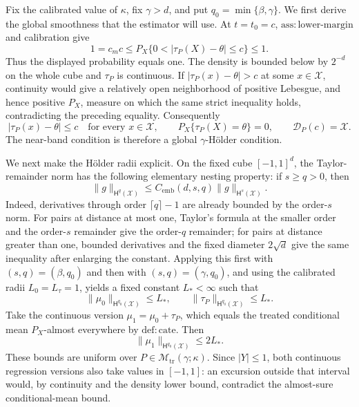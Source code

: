 Fix the calibrated value of \(\kappa\), fix \(\gamma>d\), and put \(q_0=\min\{\beta,\gamma\}\). We first derive the global smoothness that the estimator will use. At \(t=t_0=c\), \(\mathrm{ass:lower\text{-}margin}\) and calibration give
\[
1=c_m c\le P_X\{0<|\tau_P(X)-\theta|\le c\}\le1.
\]
Thus the displayed probability equals one. The density is bounded below by \(2^{-d}\) on the whole cube and \(\tau_P\) is continuous. If \(|\tau_P(x)-\theta|>c\) at some \(x\in\mathcal X\), continuity would give a relatively open neighborhood of positive Lebesgue, and hence positive \(P_X\), measure on which the same strict inequality holds, contradicting the preceding equality. Consequently
\[
|\tau_P(x)-\theta|\le c\quad\text{for every }x\in\mathcal X,
\qquad
P_X\{\tau_P(X)=\theta\}=0,
\qquad
\mathcal D_P(c)=\mathcal X.
\]
The near-band condition is therefore a global \(\gamma\)-Hölder condition.

We next make the Hölder radii explicit. On the fixed cube \([-1,1]^d\), the Taylor-remainder norm has the following elementary nesting property: if \(s\ge q>0\), then
\[
\|g\|_{\mathsf H^q(\mathcal X)}\le C_{\mathrm{emb}}(d,s,q)\|g\|_{\mathsf H^s(\mathcal X)}.
\]
Indeed, derivatives through order \(\lceil q\rceil-1\) are already bounded by the order-\(s\) norm. For pairs at distance at most one, Taylor's formula at the smaller order and the order-\(s\) remainder give the order-\(q\) remainder; for pairs at distance greater than one, bounded derivatives and the fixed diameter \(2\sqrt d\) give the same inequality after enlarging the constant. Applying this first with \((s,q)=(\beta,q_0)\) and then with \((s,q)=(\gamma,q_0)\), and using the calibrated radii \(L_0=L_\tau=1\), yields a fixed constant \(L_*<\infty\) such that
\[
\|\mu_0\|_{\mathsf H^{q_0}(\mathcal X)}\le L_*,
\qquad
\|\tau_P\|_{\mathsf H^{q_0}(\mathcal X)}\le L_*.
\]
Take the continuous version \(\mu_1=\mu_0+\tau_P\), which equals the treated conditional mean \(P_X\)-almost everywhere by \(\mathrm{def:cate}\). Then
\[
\|\mu_1\|_{\mathsf H^{q_0}(\mathcal X)}\le2L_*.
\]
These bounds are uniform over \(P\in\mathcal M_{\mathrm{tr}}(\gamma;\kappa)\). Since \(|Y|\le1\), both continuous regression versions also take values in \([-1,1]\): an excursion outside that interval would, by continuity and the density lower bound, contradict the almost-sure conditional-mean bound.

